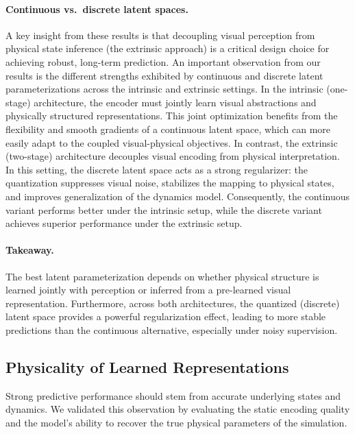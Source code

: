\documentclass[nonacm,sigconf]{acmart}
\begin{document}
\paragraph{Continuous vs.\ discrete latent spaces.}
A key insight from these results is that {decoupling visual perception from physical state inference (the extrinsic approach) is a critical design choice for achieving robust, long-term prediction.} An important observation from our results is the different strengths exhibited by continuous and discrete latent parameterizations across the intrinsic and extrinsic settings. In the intrinsic (one-stage) architecture, the encoder must jointly learn visual abstractions and physically structured representations. This joint optimization benefits from the flexibility and smooth gradients of a continuous latent space, which can more easily adapt to the coupled visual-physical objectives. In contrast, the extrinsic (two-stage) architecture decouples visual encoding from physical interpretation. In this setting, the discrete latent space acts as a strong regularizer: the quantization suppresses visual noise, stabilizes the mapping to physical states, and improves generalization of the dynamics model. Consequently, the continuous variant performs better under the intrinsic setup, while the discrete variant achieves superior performance under the extrinsic setup. 


\paragraph{Takeaway.} The best latent parameterization depends on whether physical structure is learned jointly with perception or inferred from a pre-learned visual representation.
Furthermore, across both architectures, the quantized (discrete) latent space provides a powerful regularization effect, leading to more stable predictions than the continuous alternative, especially under noisy supervision.





 
\subsection{Physicality of Learned Representations}


Strong predictive performance should stem from accurate underlying states and dynamics. We validated this observation by evaluating the static encoding quality and the model's ability to recover the true physical parameters of the simulation.
\end{document}
